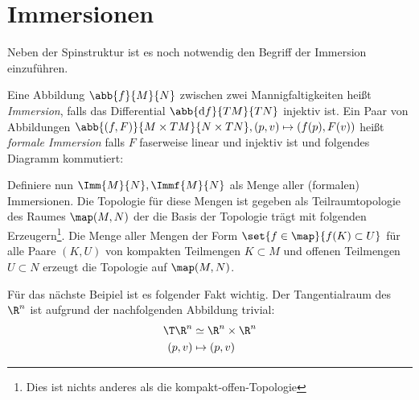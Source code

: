 



\section{Immersionen}

Neben der Spinstruktur ist es noch notwendig den Begriff der Immersion 
einzuführen.

\begin{Def}
	\label{formIso}
	Eine Abbildung $\abb{f}{M}{N}$ zwischen zwei Mannigfaltigkeiten
	heißt \textit{Immersion}, falls das Differential $\abb{\mathrm{d} f}{TM}{TN}$ 
	injektiv ist.
	Ein Paar von Abbildungen $\abb{(f,F)}{M \times TM}{N \times TN} ,%
	(p,v) \mapsto (f(p),F(v))$ heißt \textit{formale Immersion} falls $ F $ faserweise linear und injektiv ist und folgendes
	Diagramm kommutiert:
	\begin{center}
		
		
	\end{center}
	
	Definiere nun $\Imm{M}{N},\Immf{M}{N}$ als Menge aller (formalen) Immersionen. Die Topologie für diese Mengen ist gegeben als Teilraumtopologie des Raumes $\map(M,N)$ der die Basis der Topologie 
	trägt mit folgenden Erzeugern\footnote{Dies ist nichts anderes als die kompakt-offen-Topologie}. Die Menge aller Mengen der Form $\set{f \in \map}{ f(K) \subset U}$
	für alle Paare $(K,U)$ von kompakten Teilmengen $K \subset M$ und
	offenen Teilmengen $U \subset N$ erzeugt die Topologie auf $\map(M,N)$.
\end{Def}


Für das nächste Beipiel ist es folgender Fakt wichtig. Der Tangentialraum des $\R^n$ ist aufgrund der nachfolgenden Abbildung trivial:
\begin{align*}
\T \R^n &\simeq \R^n \times \R^n \\
(p,v) &\mapsto (p,v)
\end{align*}

